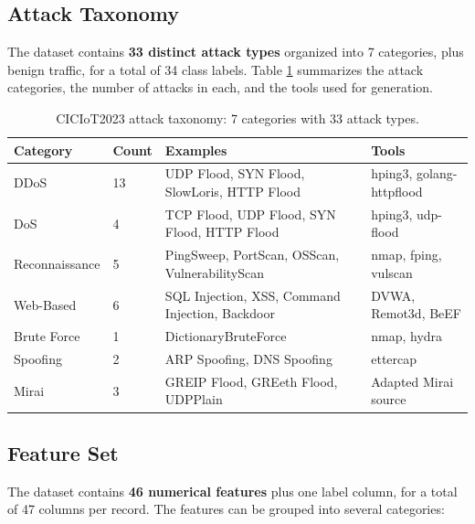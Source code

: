 \subsection{Attack Taxonomy}
\label{subsec:attack_taxonomy}

\par The dataset contains \textbf{33 distinct attack types} organized into 7 categories, plus benign traffic, for a total of 34 class labels. Table \ref{tab:attack_taxonomy} summarizes the attack categories, the number of attacks in each, and the tools used for generation.

\begin{table}[htbp]
\begin{center}
\begin{tabular}{|p{80pt}|p{30pt}|p{110pt}|p{90pt}|}
\hline
\textbf{Category} & \textbf{Count} & \textbf{Examples} & \textbf{Tools} \\
\hline
\hline DDoS & 13 & UDP Flood, SYN Flood, SlowLoris, HTTP Flood & hping3, golang-httpflood \\
\hline DoS & 4 & TCP Flood, UDP Flood, SYN Flood, HTTP Flood & hping3, udp-flood \\
\hline Reconnaissance & 5 & PingSweep, PortScan, OSScan, VulnerabilityScan & nmap, fping, vulscan \\
\hline Web-Based & 6 & SQL Injection, XSS, Command Injection, Backdoor & DVWA, Remot3d, BeEF \\
\hline Brute Force & 1 & DictionaryBruteForce & nmap, hydra \\
\hline Spoofing & 2 & ARP Spoofing, DNS Spoofing & ettercap \\
\hline Mirai & 3 & GREIP Flood, GREeth Flood, UDPPlain & Adapted Mirai source \\
\hline
\end{tabular}
\end{center}
\caption{CICIoT2023 attack taxonomy: 7 categories with 33 attack types.}
\label{tab:attack_taxonomy}
\end{table}

\subsection{Feature Set}
\label{subsec:features}

\par The dataset contains \textbf{46 numerical features} plus one label column, for a total of 47 columns per record. The features can be grouped into several categories:

